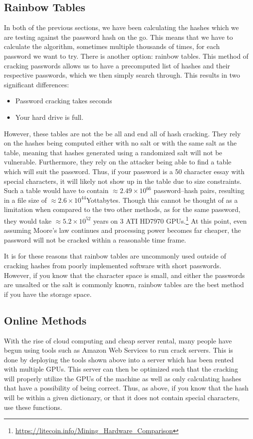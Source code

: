 		\subsection{Rainbow Tables}
			In both of the previous sections, we have been calculating the hashes which we are testing against the password hash on the go.
			This means that we have to calculate the algorithm, sometimes multiple thousands of times, for each password we want to try.
			There is another option: rainbow tables.
			This method of cracking passwords allows us to have a precomputed list of hashes and their respective passwords, which we then simply search through.
			This results in two significant differences:
			\begin{itemize}
				\item Password cracking takes seconds
				\item Your hard drive is full.
			\end{itemize}
			However, these tables are not the be all and end all of hash cracking.
			They rely on the hashes being computed either with no salt or with the same salt as the table, meaning that hashes generated using a randomized salt will not be vulnerable.
			Furthermore, they rely on the attacker being able to find a table which will suit the password.
			Thus, if your password is a 50 character essay with special characters, it will likely not show up in the table due to size constraints.
			Such a table would have to contain $\approx2.49\times10^{66}$ password--hash pairs, resulting in a file size of $\approx2.6\times10^{44}$Yottabytes.
			Though this cannot be thought of as a limitation when compared to the two other methods, as for the same password, they would take $\approx5.2\times10^{52}$ years on 3 ATI HD7970 GPUs.\footnote{\url{https://litecoin.info/Mining\_Hardware\_Comparison}}
			At this point, even assuming Moore's law continues and processing power becomes far cheaper, the password will not be cracked within a reasonable time frame.

			It is for these reasons that rainbow tables are uncommonly used outside of cracking hashes from poorly implemented software with short passwords.
			However, if you know that the character space is small, and either the passwords are unsalted or the salt is commonly known, rainbow tables are the best method if you have the storage space.
		\subsection{Online Methods}
			With the rise of cloud computing and cheap server rental, many people have begun using tools such as Amazon Web Services to run crack servers.
			This is done by deploying the tools shown above into a server which has been rented with multiple GPUs.
			This server can then be optimized such that the cracking will properly utilize the GPUs of the machine as well as only calculating hashes that have a possibility of being correct.
			Thus, as above, if you know that the hash will be within a given dictionary, or that it does not contain special characters, use these functions.

